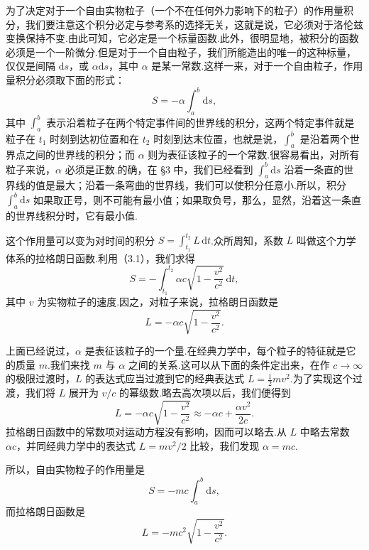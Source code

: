 为了决定对于一个自由实物粒子（一个不在任何外力影响下的粒子）的作用量积分，我们要注意这个积分必定与参考系的选择无关，这就是说，它必须对于洛伦兹变换保持不变.由此可知，它必定是一个标量函数.此外，很明显地，被积分的函数必须是一个一阶微分.但是对于一个自由粒子，我们所能造出的唯一的这种标量，仅仅是间隔 $\mathrm{d}s$，或 $\alpha\mathrm{d}s$，其中 $\alpha$ 是某一常数.这样一来，对于一个自由粒子，作用量积分必须取下面的形式：
\begin{equation*}
  S=-\alpha\int_a^b\mathrm{d}s,
\end{equation*}
其中 $\int_a^b$ 表示沿着粒子在两个特定事件间的世界线的积分，这两个特定事件就是粒子在 $t_1$ 时刻到达初位置和在 $t_2$ 时刻到达末位置，也就是说，$\int_a^b$ 是沿着两个世界点之间的世界线的积分；而 $\alpha$ 则为表征该粒子的一个常数.很容易看出，对所有粒子来说，$\alpha$ 必须是正数.的确，在 §3 中，我们已经看到 $\int_a^b\mathrm{d}s$ 沿着一条直的世界线的值是最大；沿着一条弯曲的世界线，我们可以使积分任意小.所以，积分 $\int_a^b\mathrm{d}s$ 如果取正号，则不可能有最小值；如果取负号，那么，显然，沿着这一条直的世界线积分时，它有最小值.

这个作用量可以变为对时间的积分 $S=\int_{t_1}^{t_2}L\,\mathrm{d}t$.众所周知，系数 $L$ 叫做这个力学体系的拉格朗日函数.利用（3.1），我们求得
\begin{equation*}
  S=-\int_{t_1}^{t_2}\alpha c\sqrt{1-\frac{v^2}{c^2}}\,\mathrm{d}t,
\end{equation*}
其中 $v$ 为实物粒子的速度.因之，对粒子来说，拉格朗日函数是
\begin{equation*}
  L=-\alpha c\sqrt{1-\frac{v^2}{c^2}}.
\end{equation*}

上面已经说过，$\alpha$ 是表征该粒子的一个量.在经典力学中，每个粒子的特征就是它的质量 $m$.我们来找 $m$ 与 $\alpha$ 之间的关系.这可以从下面的条件定出来，在作 $c\to\infty$ 的极限过渡时，$L$ 的表达式应当过渡到它的经典表达式 $L=\frac{1}{2}mv^2$.为了实现这个过渡，我们将 $L$ 展开为 $v/c$ 的幂级数.略去高次项以后，我们便得到
\begin{equation*}
  L=-\alpha c\sqrt{1-\frac{v^2}{c^2}}\approx-\alpha c+\frac{\alpha v^2}{2c}.
\end{equation*}
拉格朗日函数中的常数项对运动方程没有影响，因而可以略去.从 $L$ 中略去常数 $\alpha c$，并同经典力学中的表达式 $L=mv^2/2$ 比较，我们发现 $\alpha=mc$.

所以，自由实物粒子的作用量是
\begin{equation}
  S=-mc\int_a^b\mathrm{d}s,
\end{equation}
而拉格朗日函数是
\begin{equation}
  L=-mc^2\sqrt{1-\frac{v^2}{c^2}}.
\end{equation}

